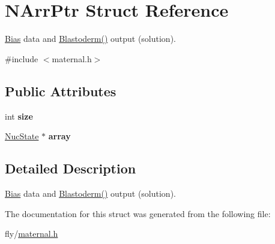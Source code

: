 \hypertarget{structNArrPtr}{
\section{NArrPtr Struct Reference}
\label{structNArrPtr}
}


\hyperlink{structBias}{Bias} data and \hyperlink{integrate_8c_a3677aab63d5dee8dfb44fba8291b5546}{Blastoderm()} output (solution).  


{\ttfamily \#include $<$maternal.h$>$}\subsection*{Public Attributes}
\begin{DoxyCompactItemize}
\item 
\hypertarget{structNArrPtr_a3888249047137b131962eab77498f310}{
int {\bfseries size}}
\label{structNArrPtr_a3888249047137b131962eab77498f310}

\item 
\hypertarget{structNArrPtr_af605ee17ed2dc78a762ca17cb781f78f}{
\hyperlink{structNucState}{NucState} $\ast$ {\bfseries array}}
\label{structNArrPtr_af605ee17ed2dc78a762ca17cb781f78f}

\end{DoxyCompactItemize}


\subsection{Detailed Description}
\hyperlink{structBias}{Bias} data and \hyperlink{integrate_8c_a3677aab63d5dee8dfb44fba8291b5546}{Blastoderm()} output (solution). 

The documentation for this struct was generated from the following file:\begin{DoxyCompactItemize}
\item 
fly/\hyperlink{maternal_8h}{maternal.h}\end{DoxyCompactItemize}
